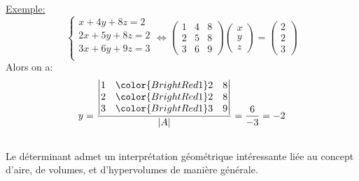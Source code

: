 \underline{Exemple:}
\[
   \begin{cases} 
      x + 4y + 8z = 2 \\
      2x + 5y + 8z = 2 \\
      3x + 6y + 9z = 3 \\
   \end{cases}   \Longleftrightarrow 
   \begin{pmatrix}
      1 & 4 & 8 \\
      2 & 5 & 8 \\
      3 & 6 & 9
   \end{pmatrix} 
   \begin{pmatrix}
      x \\
      y \\
      z  
   \end{pmatrix} =
   \begin{pmatrix}
      2 \\
      2 \\
      3  
   \end{pmatrix}
\]
Alors on a:
\[
   y = \frac{
      \begin{vmatrix}
         1 & \color{BrightRed1} 2 & 8 \\
         2 & \color{BrightRed1} 2 & 8  \\
         3 & \color{BrightRed1} 3 & 9
      \end{vmatrix}
   }{|A|} = \frac{6}{-3} = -2
\]

\subsection*{}

Le déterminant admet un interprétation géométrique intéressante liée au concept d'aire, de volumes, et d'hypervolumes de manière générale. \<

